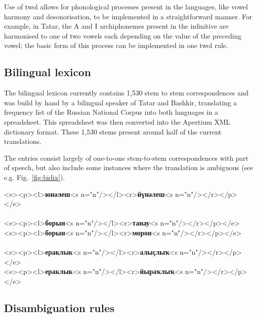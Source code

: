 \documentclass[11pt,a4paper]{article}
\begin{document}
Use of twol allows for phonological processes present in the languages, like vowel harmony and desonorisation, to be implemented in a straightforward manner.  For example, in Tatar, the A and I archiphonemes present in the infinitive are harmonised to one of two vowels each depending on the value of the preceding vowel; the basic form of this process can be implemented in one twol rule.

\subsection{Bilingual lexicon}

The bilingual lexicon currently contains 1,530 stem to stem correspondences and was build by hand by a bilingual 
speaker of Tatar and Bashkir, translating a frequency list of the Russian National Corpus \cite{rnc} 
into both languages in a spreadsheet. This spreadsheet was then converted into the Apertium
XML dictionary format. These 1,530 stems present around half of the current translations.

The entries consist largely of one-to-one stem-to-stem correspondences with part of speech, but also
include some instances where the translation is ambiguous (see e.g. Fig.~\ref{fig:bidix}).

\begin{figure*}
\begin{center}
\begin{texttt}
    <e><p><l>\textbf{юнәлеш}<s n="n"/></l><r>\textbf{йүнәлеш}<s n="n"/></r></p></e> \\
~\\
    <e><p><l>\textbf{борын}<s n="n"/></l><r>\textbf{танау}<s n="n"/></r></p></e> \\
    <e><p><l>\textbf{борын}<s n="n"/></l><r>\textbf{морон}<s n="n"/></r></p></e> \\
~\\
    <e><p><l>\textbf{ераклык}<s n="n"/></l><r>\textbf{алыҫлыҡ}<s n="n"/></r></p></e> \\
    <e><p><l>\textbf{ераклык}<s n="n"/></l><r>\textbf{йыраҡлыҡ}<s n="n"/></r></p></e>

\end{texttt}
\end{center}
\caption{Example entries from the bilingual transfer lexicon. Tatar is on the left, and Bashkir on the right}
\label{fig:bidix}
\end{figure*}

\subsection{Disambiguation rules}
\end{document}
